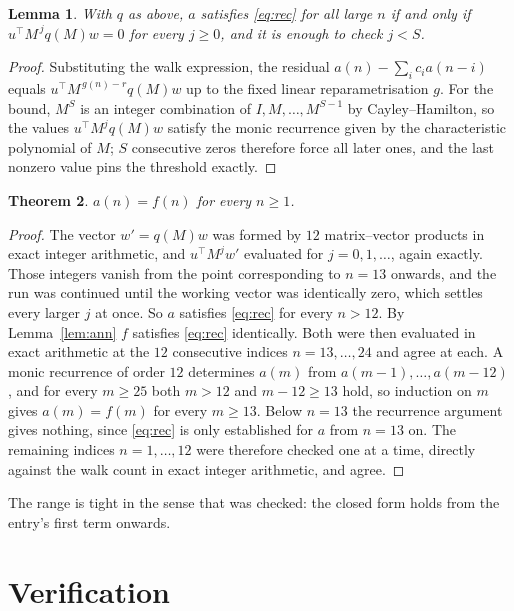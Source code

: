 \documentclass[11pt,a4paper]{article}
\theoremstyle{plain}
\newtheorem{theorem}{Theorem}
\newtheorem{lemma}[theorem]{Lemma}
\theoremstyle{definition}
\begin{document}
\begin{lemma}\label{lem:crit}
With $q$ as above, $a$ satisfies \eqref{eq:rec} for all large $n$ if and only if
$u^{\!\top}M^{\,j}q(M)w=0$ for every $j\ge0$, and it is enough to check $j<S$.
\end{lemma}

\begin{proof}
Substituting the walk expression, the residual $a(n)-\sum_ic_ia(n-i)$ equals
$u^{\!\top}M^{\,g(n)-r}q(M)w$ up to the fixed linear reparametrisation $g$. For the bound,
$M^{S}$ is an integer combination of $I,M,\dots,M^{S-1}$ by Cayley--Hamilton, so the values
$u^{\!\top}M^{j}q(M)w$ satisfy the monic recurrence given by the characteristic polynomial of
$M$; $S$ consecutive zeros therefore force all later ones, and the last nonzero value pins the
threshold exactly.
\end{proof}

\begin{theorem}
$a(n)=f(n)$ for every $n\ge1$.
\end{theorem}

\begin{proof}
The vector $w'=q(M)w$ was formed by $12$ matrix--vector products in exact integer
arithmetic, and $u^{\!\top}M^{j}w'$ evaluated for $j=0,1,\dots$, again exactly. Those integers
vanish from the point corresponding to $n=13$ onwards, and the run was continued until the
working vector was identically zero, which settles every larger $j$ at once. So $a$ satisfies
\eqref{eq:rec} for every $n>12$. By Lemma~\ref{lem:ann} $f$ satisfies \eqref{eq:rec}
identically. Both were then evaluated in exact arithmetic at the $12$ consecutive indices
$n=13,\dots,24$ and agree at each. A monic recurrence of order $12$
determines $a(m)$ from $a(m-1),\dots,a(m-12)$, and for every $m\ge25$ both
$m>12$ and $m-12\ge13$ hold, so induction on $m$ gives $a(m)=f(m)$ for every
$m\ge13$.
Below $n=13$ the recurrence argument gives nothing, since \eqref{eq:rec} is only
established for $a$ from $n=13$ on. The remaining indices $n=1,\dots,12$ were
therefore checked one at a time, directly against the walk count in exact integer arithmetic,
and agree.
\end{proof}

The range is tight in the sense that was checked: the closed form holds from the entry's first term onwards.

\section{Verification}
\end{document}
